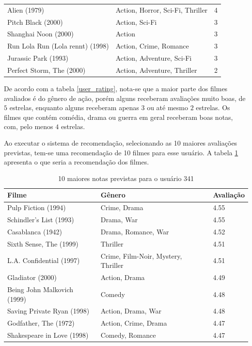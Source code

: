 \documentclass[12pt,a4paper,header]{abnt}
\begin{document}
\begin{longtable}{@{}lll@{}}
Alien (1979)                        & Action, Horror, Sci-Fi, Thriller & 4                  \\
Pitch Black (2000)                  & Action, Sci-Fi                 & 3                  \\
Shanghai Noon (2000)                & Action                        & 3                  \\
Run Lola Run (Lola rennt) (1998)    & Action, Crime, Romance          & 3                  \\
Jurassic Park (1993)                & Action, Adventure, Sci-Fi       & 3                  \\
Perfect Storm, The (2000)           & Action, Adventure, Thriller     & 2                  \\* \bottomrule
\end{longtable}

De acordo com a tabela \ref{user_rating}, nota-se que a maior parte dos filmes avaliados é do gênero de ação, porém alguns receberam avaliações muito boas, de $5$ estrelas, enquanto alguns receberam apenas $3$ ou até mesmo $2$ estrelas. Os filmes que contém comédia, drama ou guerra em geral receberam boas notas, com, pelo menos $4$ estrelas.

Ao executar o sistema de recomendação, selecionando as 10 maiores avaliações previstas, tem-se uma recomendação de 10 filmes para esse usuário. A tabela \ref{recom_usuario} apresenta o que seria a recomendação dos filmes.

\begin{longtable}{@{}lll@{}}
\caption{10 maiores notas previstas para o usuário 341}
\label{recom_usuario}\\
\toprule
\textbf{Filme}              & \textbf{Gênero}                  & \textbf{Avaliação} \\* \midrule
\endhead
%
\bottomrule
\endfoot
%
\endlastfoot
%
Pulp Fiction (1994)         & Crime, Drama                      & 4.55               \\
Schindler's List (1993)     & Drama, War                        & 4.55               \\
Casablanca (1942)           & Drama, Romance, War                & 4.52               \\
Sixth Sense, The (1999)     & Thriller                         & 4.51               \\
L.A. Confidential (1997)    & Crime, Film-Noir, Mystery, Thriller & 4.51               \\
Gladiator (2000)            & Action, Drama                     & 4.49               \\
Being John Malkovich (1999) & Comedy                           & 4.48               \\
Saving Private Ryan (1998)  & Action, Drama, War                 & 4.48               \\
Godfather, The (1972)       & Action, Crime, Drama               & 4.47               \\
Shakespeare in Love (1998)  & Comedy, Romance                   & 4.47               \\* \bottomrule
\end{longtable}
\end{document}
